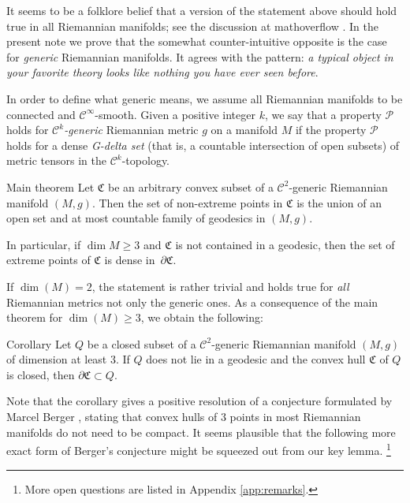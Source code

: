 \documentclass[a4paper,10pt]{article}
\begin{document}
It seems to be a folklore belief that a version of the statement above should hold true in all Riemannian manifolds;
see the discussion at mathoverflow \cite{petrunin-2009}.
In the present note we prove that the somewhat counter-intuitive opposite is the case for \emph{generic} Riemannian manifolds.
It agrees with the pattern: \emph{a typical object in your favorite theory looks like nothing you have ever seen before}.




In order to define what generic means, we assume all Riemannian manifolds to be  connected and $\mathcal C^\infty$-smooth.
Given a positive integer $k$, we say that a property $\mathcal P$ holds for \emph{$\mathcal C^k$-generic} Riemannian metric $g$ on a manifold $M$ 
if the property $\mathcal P$ holds for a dense \emph{G-delta set} (that is, a countable intersection of open subsets) of metric tensors in the $\mathcal C^k$-topology.

\begin{thm}{Main theorem}\label{thm:main}
Let $\mathfrak C$ be an arbitrary convex subset of a $\mathcal C^2$-generic Riemannian manifold $(M,g)$.
Then the set of non-extreme points in $\mathfrak C$ is the union of an open set and at most countable family of geodesics in $(M,g)$. 

In particular, if $\dim M\ge 3$ and $\mathfrak C$ is not contained in a geodesic, then the set of
extreme points of $\mathfrak{C}$ is dense in~$\partial\mathfrak{C}$.
\end{thm}



If $\dim (M) =2$, the statement is rather trivial and holds true for \emph{all} Riemannian metrics not only the generic ones.
As a consequence  of the main theorem for $\dim (M) \geq 3$, we obtain the following:

\begin{thm}{Corollary}\label{cor:caratheodory}
Let $Q$ be a closed subset of a $\mathcal C^2$-generic Riemannian manifold $(M,g)$ of dimension at least $3$. If $Q$ does not lie in a  geodesic and
the convex hull $\mathfrak C$ of $Q$ is closed, then $\partial \mathfrak C \subset Q$.
\end{thm}

Note that the corollary gives a positive resolution of a conjecture formulated by Marcel Berger
\cite[Note 6.1.3.1]{berger-2003}, stating that convex hulls of $3$ points in most Riemannian manifolds do not need to be  compact.
It seems plausible that  the following more exact form of Berger's conjecture might be squeezed out from our key lemma.%
\footnote{More open questions are listed in  Appendix \ref{app:remarks}.}
\end{document}
